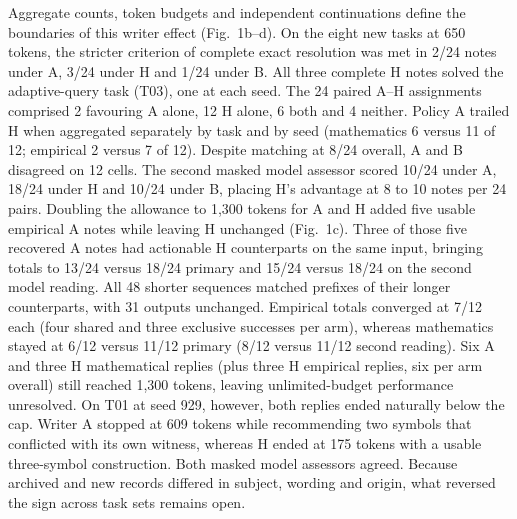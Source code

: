 Aggregate counts, token budgets and independent continuations define the boundaries of this writer effect (Fig.~1b--d). On the eight new tasks at 650 tokens, the stricter criterion of complete exact resolution was met in 2/24 notes under A, 3/24 under H and 1/24 under B. All three complete H notes solved the adaptive-query task (T03), one at each seed. The 24 paired A--H assignments comprised 2 favouring A alone, 12 H alone, 6 both and 4 neither. Policy A trailed H when aggregated separately by task and by seed (mathematics 6 versus 11 of 12; empirical 2 versus 7 of 12). Despite matching at 8/24 overall, A and B disagreed on 12 cells. The second masked model assessor scored 10/24 under A, 18/24 under H and 10/24 under B, placing H's advantage at 8 to 10 notes per 24 pairs. Doubling the allowance to 1,300 tokens for A and H added five usable empirical A notes while leaving H unchanged (Fig.~1c). Three of those five recovered A notes had actionable H counterparts on the same input, bringing totals to 13/24 versus 18/24 primary and 15/24 versus 18/24 on the second model reading. All 48 shorter sequences matched prefixes of their longer counterparts, with 31 outputs unchanged. Empirical totals converged at 7/12 each (four shared and three exclusive successes per arm), whereas mathematics stayed at 6/12 versus 11/12 primary (8/12 versus 11/12 second reading). Six A and three H mathematical replies (plus three H empirical replies, six per arm overall) still reached 1,300 tokens, leaving unlimited-budget performance unresolved. On T01 at seed 929, however, both replies ended naturally below the cap. Writer A stopped at 609 tokens while recommending two symbols that conflicted with its own witness, whereas H ended at 175 tokens with a usable three-symbol construction. Both masked model assessors agreed. Because archived and new records differed in subject, wording and origin, what reversed the sign across task sets remains open.

